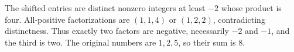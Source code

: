 The shifted entries are distinct nonzero integers at least $-2$ whose product is four. All-positive factorizations are $(1,1,4)$ or $(1,2,2)$, contradicting distinctness. Thus exactly two factors are negative, necessarily $-2$ and $-1$, and the third is two. The original numbers are $1,2,5$, so their sum is $\boxed8$.
